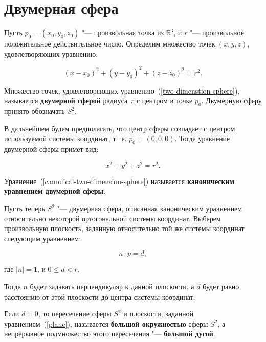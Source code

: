 \section{Двумерная сфера}

Пусть $p_0=(x_0,y_0,z_0)$ "--- произвольная точка из $\mathbb{R}^3$, и $r$ "--- произвольное положительное
действительное число. Определим множество точек $(x,y,z)$, удовлетворяющих уравнению:

\begin{equation}
(x-x_0)^2+(y-y_0)^2+(z-z_0)^2=r^2.
\label{two-dimenstion-sphere}
\end{equation}

\begin{definition}
Множество точек, удовлетворяющих уравнению~(\ref{two-dimenstion-sphere}), называется \textbf{двумерной сферой}
радиуса~$r$ с центром в точке $p_0$. Двумерную сферу принято обозначать $S^2$.
\end{definition}

В дальнейшем будем предполагать, что центр сферы совпадает с центром используемой системы координат, т.~е. $p_0=(0,0,
0)$. Тогда уравнение двумерной сферы примет вид:

\begin{equation}
x^2+y^2+z^2=r^2.
\label{canonical-two-dimension-sphere}
\end{equation}

\begin{definition}
Уравнение~(\ref{canonical-two-dimension-sphere}) называется \textbf{каноническим уравнением двумерной сферы}.
\end{definition}

Пусть теперь $S^2$ "--- двумерная сфера, описанная каноническим уравнением относительно некоторой ортогональной
системы координат. Выберем произвольную плоскость, заданную относительно той же системы координат следующим уравнением:

\begin{equation}
n \cdot p = d,
\label{plane}
\end{equation}

\noindent где $|n|=1$, и $0 \le d < r$.

Тогда $n$ будет задавать перпендикуляр к данной плоскости, а $d$ будет равно расстоянию от этой плоскости до центра
системы координат.

\begin{definition}
Если $d=0$, то пересечение сферы $S^2$ и плоскости, заданной уравнением~(\ref{plane}), называется \textbf{большой
окружностью} сферы $S^2$, а непрерывное подмножество этого пересечения "--- \textbf{большой дугой}.
\end{definition}

